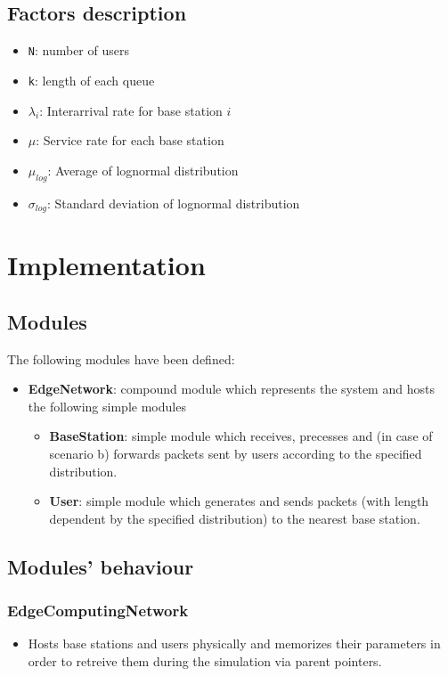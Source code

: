 \documentclass{report}
\begin{document}
\section{Factors description}\label{factors}
\begin{itemize}
    \item \texttt{N}: number of users
    \item \texttt{k}: length of each queue
    \item $\lambda_i$: Interarrival rate for base station $i$
    \item $\mu$: Service rate for each base station
    \item $\mu_{log}$: Average of lognormal distribution
    \item $\sigma_{log}$: Standard deviation of lognormal distribution
\end{itemize}

\chapter{Implementation}
\section{Modules}
The following modules have been defined:
\begin{itemize}
    \item \textbf{EdgeNetwork}: compound module which represents the system and hosts the following simple modules
    \begin{itemize}
        \item \textbf{BaseStation}: simple module which receives, precesses and (in case of scenario b) forwards packets sent by users according to the specified distribution. 
        \item \textbf{User}: simple module which generates and sends packets (with length dependent by the specified distribution) to the nearest base station.
    \end{itemize}    
\end{itemize}

\section{Modules' behaviour}
\subsection{EdgeComputingNetwork}
\begin{itemize}
    \item Hosts base stations and users physically and memorizes their parameters in order to retreive them during the simulation via parent pointers.
\end{itemize}
\end{document}

